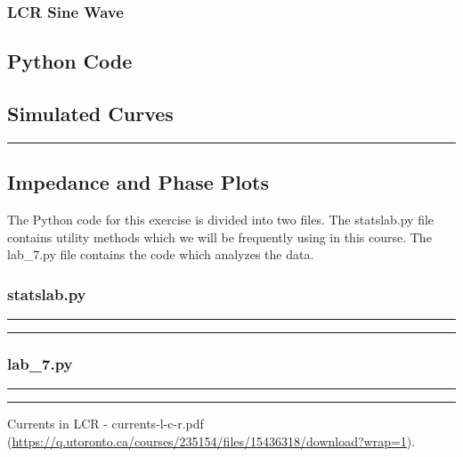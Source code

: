 \documentclass[a4paper,12pt]{article}
\begin{document}
\subsubsection{LCR Sine Wave}


\pagebreak

\subsection{Python Code}

\subsection{Simulated Curves}


\noindent\rule{\textwidth}{1pt}

\pagebreak

\subsection{Impedance and Phase Plots}

The Python code for this exercise is divided into two files. The statslab.py file contains utility methods
which we will be frequently using in this course. The lab\_7.py file contains the code which analyzes
the data.

\subsubsection{statslab.py}
\noindent\rule{\textwidth}{1pt}

\noindent\rule{\textwidth}{1pt}

\pagebreak

\subsubsection{lab\_7.py}
\noindent\rule{\textwidth}{1pt}

\noindent\rule{\textwidth}{1pt}


\pagebreak

\begin{thebibliography}{99}

 Currents in LCR - currents-l-c-r.pdf (\url{https://q.utoronto.ca/courses/235154/files/15436318/download?wrap=1}).

\end{thebibliography}
\end{document}
